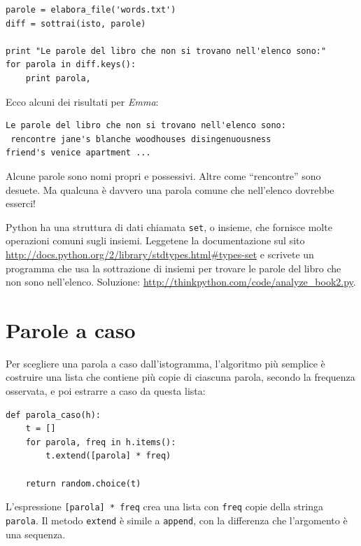 \documentclass[10pt]{book}
\begin{document}
\begin{verbatim}
parole = elabora_file('words.txt')
diff = sottrai(isto, parole)

print "Le parole del libro che non si trovano nell'elenco sono:"
for parola in diff.keys():
    print parola,
\end{verbatim}
%
Ecco alcuni dei risultati per {\em Emma}:

\begin{verbatim}
Le parole del libro che non si trovano nell'elenco sono:
 rencontre jane's blanche woodhouses disingenuousness 
friend's venice apartment ...
\end{verbatim}
%
Alcune parole sono nomi propri e possessivi. Altre come ``rencontre'' sono desuete. Ma qualcuna è davvero una parola comune che nell'elenco dovrebbe esserci!

\begin{exercise}

Python ha una struttura di dati chiamata {\tt set}, o insieme, che fornisce molte operazioni comuni sugli insiemi. Leggetene la documentazione sul sito  
\url{http://docs.python.org/2/library/stdtypes.html#types-set} e scrivete un programma che usa la sottrazione di insiemi per trovare le parole del libro che non sono nell'elenco. Soluzione:
\url{http://thinkpython.com/code/analyze_book2.py}.

\end{exercise}


\section{Parole a caso}
\label{randomwords}

Per scegliere una parola a caso dall'istogramma, l'algoritmo più semplice è  costruire una lista che contiene più copie di ciascuna parola, secondo la frequenza osservata, e poi estrarre a caso da questa lista:

\begin{verbatim}
def parola_caso(h):
    t = []
    for parola, freq in h.items():
        t.extend([parola] * freq)

    return random.choice(t)
\end{verbatim}
%
L'espressione {\tt [parola] * freq} crea una lista con {\tt freq}
copie della stringa {\tt parola}.  Il metodo {\tt extend}
è simile a {\tt append}, con la differenza che l'argomento è una sequenza.
\end{document}
